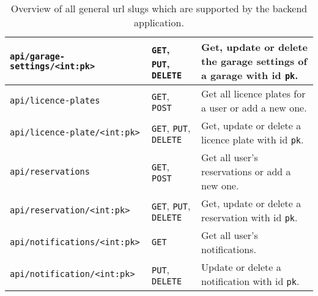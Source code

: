 \begin{table}[htp]
\begin{tabular}{|l|l|p{7cm}|}
        \hline
        \texttt{api/garage-settings/<int:pk>} &  \texttt{GET}, \texttt{PUT}, \texttt{DELETE
        } & Get, update or delete the garage settings of a garage with id \texttt{pk}.\\
        \hline
        \texttt{api/licence-plates} &  \texttt{GET}, \texttt{POST} & Get all licence plates for a user or add a new one.\\
        \hline
        \texttt{api/licence-plate/<int:pk>} &  \texttt{GET}, \texttt{PUT}, \texttt{DELETE} & Get, update or delete a licence plate with id \texttt{pk}. \\
        \hline
        \texttt{api/reservations} &  \texttt{GET}, \texttt{POST} & Get all user's reservations or add a new one.\\
        \hline
        \texttt{api/reservation/<int:pk>} &  \texttt{GET}, \texttt{PUT}, \texttt{DELETE
        } & Get, update or delete a reservation with id \texttt{pk}.\\
        \hline
        \texttt{api/notifications/<int:pk>} &  \texttt{GET} & Get all user's notifications.\\
        \hline
        \texttt{api/notification/<int:pk>} &  \texttt{PUT}, \texttt{DELETE
        } & Update or delete a notification with id \texttt{pk}.\\
        \hline
        \end{tabular}
    \caption{Overview of all general \ac{url} slugs which are supported by the backend application.}
    \label{tab:general-url}
\end{table}


